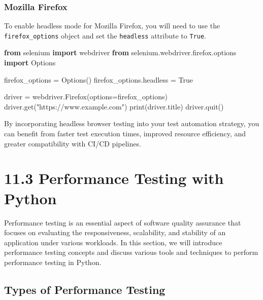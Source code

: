 \documentclass[
  paper=a4,
  ,captions=tableheading
]{scrartcl}
\newenvironment{Shaded}{}{}
\newcommand{\BuiltInTok}[1]{\textcolor[rgb]{0.00,0.50,0.00}{#1}}
\newcommand{\ImportTok}[1]{\textcolor[rgb]{0.00,0.50,0.00}{\textbf{#1}}}
\newcommand{\NormalTok}[1]{#1}
\newcommand{\OperatorTok}[1]{\textcolor[rgb]{0.40,0.40,0.40}{#1}}
\newcommand{\StringTok}[1]{\textcolor[rgb]{0.25,0.44,0.63}{#1}}
\newcommand{\VariableTok}[1]{\textcolor[rgb]{0.10,0.09,0.49}{#1}}
\begin{document}
\hypertarget{mozilla-firefox}{%
\subsubsection{Mozilla Firefox}\label{mozilla-firefox}}

To enable headless mode for Mozilla Firefox, you will need to use the
\texttt{firefox\_options} object and set the \texttt{headless} attribute
to \texttt{True}.

\begin{Shaded}
\begin{Highlighting}[]
\ImportTok{from}\NormalTok{ selenium }\ImportTok{import}\NormalTok{ webdriver}
\ImportTok{from}\NormalTok{ selenium.webdriver.firefox.options }\ImportTok{import}\NormalTok{ Options}

\NormalTok{firefox\_options }\OperatorTok{=}\NormalTok{ Options()}
\NormalTok{firefox\_options.headless }\OperatorTok{=} \VariableTok{True}

\NormalTok{driver }\OperatorTok{=}\NormalTok{ webdriver.Firefox(options}\OperatorTok{=}\NormalTok{firefox\_options)}
\NormalTok{driver.get(}\StringTok{"https://www.example.com"}\NormalTok{)}
\BuiltInTok{print}\NormalTok{(driver.title)}
\NormalTok{driver.quit()}
\end{Highlighting}
\end{Shaded}

By incorporating headless browser testing into your test automation
strategy, you can benefit from faster test execution times, improved
resource efficiency, and greater compatibility with CI/CD pipelines.

\hypertarget{performance-testing-with-python}{%
\section{11.3 Performance Testing with
Python}\label{performance-testing-with-python}}

Performance testing is an essential aspect of software quality assurance
that focuses on evaluating the responsiveness, scalability, and
stability of an application under various workloads. In this section, we
will introduce performance testing concepts and discuss various tools
and techniques to perform performance testing in Python.

\hypertarget{types-of-performance-testing}{%
\subsection{Types of Performance
Testing}\label{types-of-performance-testing}}
\end{document}
